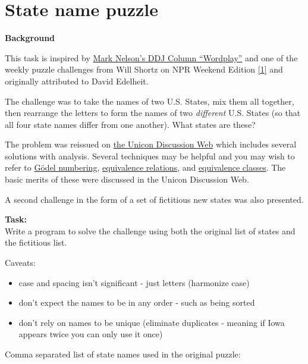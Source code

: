 \pagebreak{}
\section*{State name puzzle}

\textbf{Background}

This task is inspired by
\href{http://drdobbs.com/windows/198701685}{Mark Nelson's DDJ Column
  ``Wordplay''} and one of the weekly puzzle challenges from Will
Shortz on NPR Weekend Edition
\href{http://www.npr.org/templates/story/story.php?storyId=9264290}{{[}1{]}}
and originally attributed to David Edelheit.

The challenge was to take the names of two U.S. States, mix them all
together, then rearrange the letters to form the names of two
\emph{different} U.S. States (so that all four state names differ from
one another). What states are these?

The problem was reissued on
\href{https://tapestry.tucson.az.us/twiki/bin/view/Main/StateNamesPuzzle}{the
Unicon Discussion Web} which includes several solutions with analysis.
Several techniques may be helpful and you may wish to refer to
\href{http://en.wikipedia.org/wiki/Goedel\_numbering}{Gödel numbering},
\href{http://en.wikipedia.org/wiki/Equivalence\_relation}{equivalence
relations}, and
\href{http://en.wikipedia.org/wiki/Equivalence\_classes}{equivalence
classes}. The basic merits of these were discussed in the Unicon
Discussion Web.

A second challenge in the form of a set of fictitious new states was
also presented.

\pagebreak{}

\textbf{Task:}\\ Write a program to solve the challenge using both the
original list of states and the fictitious list.

Caveats:

\begin{itemize}
\item
  case and spacing isn't significant - just letters (harmonize case)
\item
  don't expect the names to be in any order - such as being sorted
\item
  don't rely on names to be unique (eliminate duplicates - meaning if
  Iowa appears twice you can only use it once)
\end{itemize}

Comma separated list of state names used in the original puzzle:

